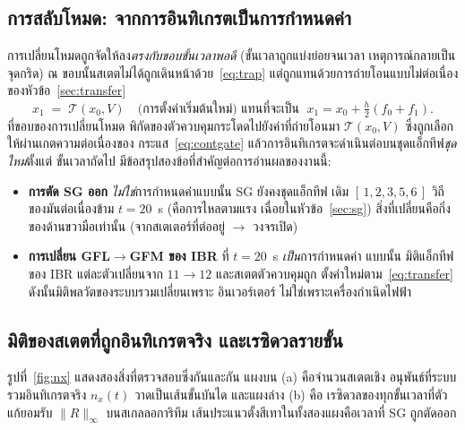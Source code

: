\documentclass[12pt,a4paper]{article}
\begin{document}
\subsection{การสลับโหมด: จากการอินทิเกรตเป็นการกำหนดค่า}\label{sec:ts-switch}
การเปลี่ยนโหมดถูกจัดให้ลง\emph{ตรงกับขอบขั้นเวลาพอดี} (ขั้นเวลาถูกแบ่งย่อยจนเวลา
เหตุการณ์กลายเป็นจุดกริด) ณ ขอบนั้นสเตตไม่ได้ถูกเดินหน้าด้วย~\eqref{eq:trap}
แต่ถูกแทนด้วยการถ่ายโอนแบบไม่ต่อเนื่องของหัวข้อ~\ref{sec:transfer}
\begin{equation}
  x_1 \;=\; \mathcal{T}(x_0,V)\quad\text{(การตั้งค่าเริ่มต้นใหม่) แทนที่จะเป็น }
  \;x_1=x_0+\tfrac{h}{2}(f_0+f_1).
  \label{eq:assign}
\end{equation}
ที่ขอบของการเปลี่ยนโหมด พิกัดของตัวควบคุมกระโดดไปยังค่าที่ถ่ายโอนมา
$\mathcal T(x_0,V)$ ซึ่งถูกเลือกให้ผ่านเกตความต่อเนื่องของ
กระแส~\eqref{eq:contgate} แล้วการอินทิเกรตจะดำเนินต่อบนชุดแอ็กทีฟ\emph{ชุดใหม่}ตั้งแต่
ขั้นเวลาถัดไป มีข้อสรุปสองข้อที่สำคัญต่อการอ่านผลของงานนี้:
\begin{itemize}\itemsep2pt
  \item \textbf{การตัด SG ออก} \emph{ไม่ใช่}การกำหนดค่าแบบนั้น SG ยังคงชุดแอ็กทีฟ
        เดิม $[\,1,2,3,5,6\,]$ วิถีของมันต่อเนื่องข้าม $t=20$~s (คือการไหลตามแรง
        เฉื่อยในหัวข้อ~\ref{sec:sg}) สิ่งที่เปลี่ยนคือกิ่งของด้านขวามือเท่านั้น
        (จากสเตเตอร์ที่ต่ออยู่ $\to$ วงจรเปิด)
  \item \textbf{การเปลี่ยน GFL$\to$GFM ของ IBR} ที่ $t=20$~s \emph{เป็น}การกำหนดค่า
        แบบนั้น มิติแอ็กทีฟของ IBR แต่ละตัวเปลี่ยนจาก $11\to12$ และสเตตตัวควบคุมถูก
        ตั้งค่าใหม่ตาม~\eqref{eq:transfer} ดังนั้นมิติพลวัตของระบบรวมเปลี่ยนเพราะ
        อินเวอร์เตอร์ ไม่ใช่เพราะเครื่องกำเนิดไฟฟ้า
\end{itemize}

\subsection{มิติของสเตตที่ถูกอินทิเกรตจริง และเรซิดวลรายขั้น}\label{sec:ts-nx}
รูปที่~\ref{fig:nx} แสดงสองสิ่งที่ตรวจสอบซึ่งกันและกัน แผงบน (a) คือจำนวนสเตตเชิง
อนุพันธ์ที่ระบบรวมอินทิเกรตจริง $n_x(t)$ วาดเป็นเส้นขั้นบันได และแผงล่าง (b) คือ
เรซิดวลของทุกขั้นเวลาที่ตัวแก้ยอมรับ $\lVert R\rVert_\infty$ บนสเกลลอการิทึม
เส้นประแนวตั้งสีเทาในทั้งสองแผงคือเวลาที่ SG ถูกตัดออก
\end{document}

